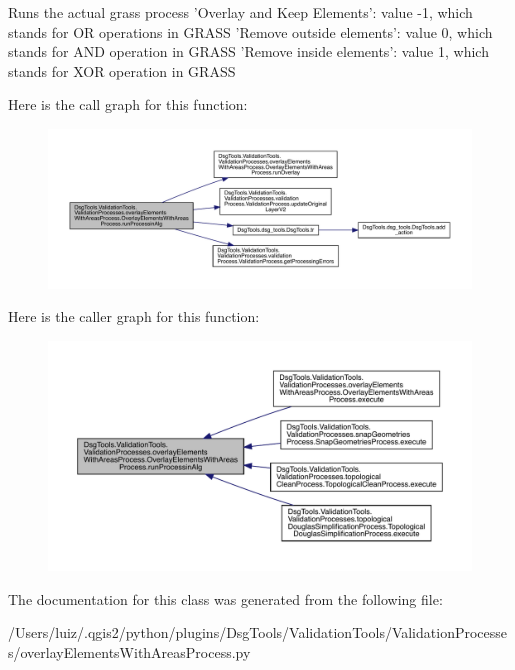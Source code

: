 \begin{DoxyVerb}Runs the actual grass process
'Overlay and Keep Elements': value -1, which stands for OR operations in GRASS
'Remove outside elements': value 0, which stands for AND operation in GRASS
'Remove inside elements': value 1, which stands for XOR operation in GRASS
\end{DoxyVerb}
 Here is the call graph for this function\+:
\nopagebreak
\begin{figure}[H]
\begin{center}
\leavevmode
\includegraphics[width=350pt]{class_dsg_tools_1_1_validation_tools_1_1_validation_processes_1_1overlay_elements_with_areas_pro00eacf8cfa659de181e10fade302dbfa_ad487029d2a83b2ef0bfb420575117d89_cgraph}
\end{center}
\end{figure}
Here is the caller graph for this function\+:
\nopagebreak
\begin{figure}[H]
\begin{center}
\leavevmode
\includegraphics[width=350pt]{class_dsg_tools_1_1_validation_tools_1_1_validation_processes_1_1overlay_elements_with_areas_pro00eacf8cfa659de181e10fade302dbfa_ad487029d2a83b2ef0bfb420575117d89_icgraph}
\end{center}
\end{figure}


The documentation for this class was generated from the following file\+:\begin{DoxyCompactItemize}
\item 
/\+Users/luiz/.\+qgis2/python/plugins/\+Dsg\+Tools/\+Validation\+Tools/\+Validation\+Processes/overlay\+Elements\+With\+Areas\+Process.\+py\end{DoxyCompactItemize}
